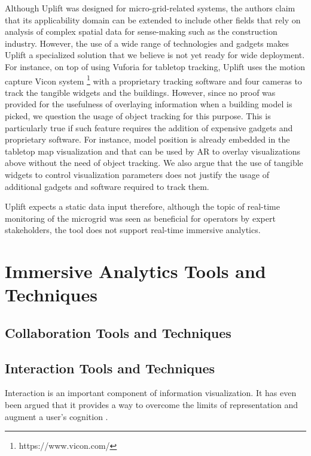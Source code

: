 \documentclass{vgtc}                          %
\begin{document}
\noindent Although Uplift was designed for micro-grid-related systems,
the authors claim that its applicability domain can be extended to include
other fields that rely on analysis of complex spatial data for sense-making
such as the construction industry. However, the use of a wide range of technologies
and gadgets makes Uplift a specialized solution that we believe is not yet
ready for wide deployment. For instance, on top of using Vuforia for tabletop
tracking, Uplift uses the motion capture Vicon system
\footnote{https://www.vicon.com/} with a proprietary tracking software and four
cameras to track the tangible widgets and the buildings. However,
since no proof was provided for the usefulness of overlaying information when
a building model is picked, we question the usage of object tracking for this
purpose. This is particularly true if such feature requires the addition of
expensive gadgets and proprietary software. For instance, model position is
already embedded in the tabletop map visualization and that can be used by AR
to overlay visualizations above without the need of object tracking. We also
argue that the use of tangible widgets to control visualization parameters does
not justify the usage of additional gadgets and software required to track
them.

\medskip

\noindent Uplift expects a static data input therefore, although the topic of
real-time monitoring of the microgrid was seen as beneficial for operators by
expert stakeholders, the tool does not support real-time immersive analytics.

\section{Immersive Analytics Tools and Techniques}
\subsection{Collaboration Tools and Techniques}
\subsection{Interaction Tools and Techniques}

\noindent Interaction is an important component of information visualization. It has even been argued that it provides
a way to overcome the limits of representation and augment a user's cognition \cite{interaction_infovis}.

\smallskip
\end{document}
